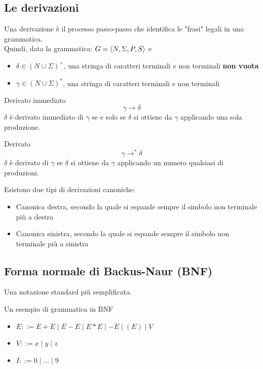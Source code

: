 \documentclass{article}
\begin{document}
\subsection{Le derivazioni}
Una derivazione è il processo passo-passo che identifica le "frasi" legali in una grammatica.\\
Quindi, data la grammatica: \(G = \langle N,\Sigma,P,S \rangle\) e
\begin{itemize}
    \item \(\delta \in (N \cup \Sigma)^+\), una stringa di caratteri terminali e non terminali \textbf{non vuota}
    \item \(\gamma \in (N \cup \Sigma)^*\), una stringa di caratteri terminali e non terminali
\end{itemize}
\begin{dfn}{Derivato immediato}
    \[\gamma \rightarrow \delta\]
    \(\delta\) è derivato immediato di \(\gamma\) se e solo se \(\delta\) si ottiene da \(\gamma\) applicando una sola produzione.
\end{dfn}
\begin{dfn}{Derivato}
    \[\gamma \rightarrow^* \delta\]
    \(\delta\) è derivato di \(\gamma\) se \(\delta\) si ottiene da \(\gamma\) applicando un numero qualsiasi di produzioni.
\end{dfn}
Esistono due tipi di derivazioni canoniche:
\begin{itemize}
    \item Canonica destra, secondo la quale si espande sempre il simbolo non terminale più a destra
    \item Canonica sinistra, secondo la quale si espande sempre il simbolo non terminale più a sinistra
\end{itemize}

\subsection{Forma normale di Backus-Naur (BNF)}
\begin{dfn}
    Una notazione standard più semplificata.
    \begin{eg}
        Un esempio di grammatica in BNF
        \begin{itemize}
            \item \(E ::= E + E \mid E - E \mid E * E \mid -E \mid (E) \mid V\)
            \item \(V ::= x \mid y \mid z\)
            \item \(I ::= 0 \mid \ldots \mid 9\)
        \end{itemize}
    \end{eg}
\end{dfn}
\end{document}
